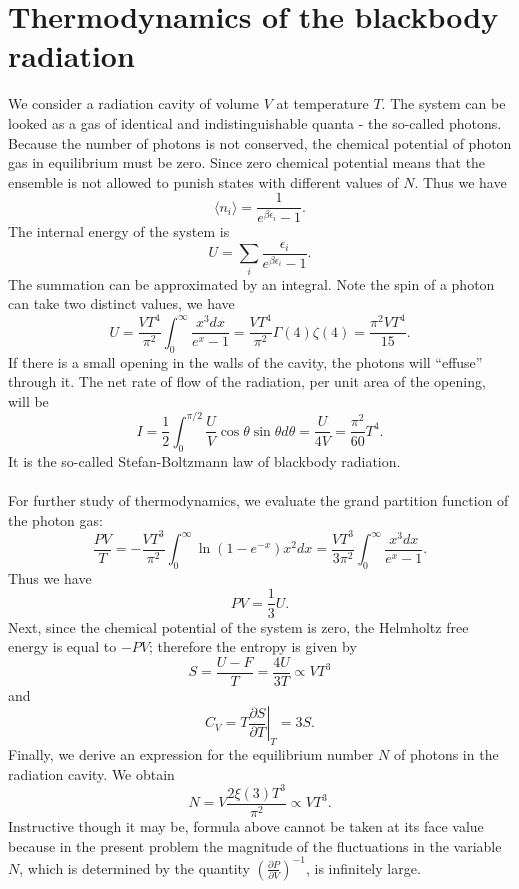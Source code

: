 \section{Thermodynamics of the blackbody radiation}
We consider a radiation cavity of volume $V$ at temperature $T$. The system can be looked as a gas of identical and indistinguishable quanta - the so-called photons. 
Because the number of photons is not conserved, the chemical potential of photon gas in equilibrium must be zero. Since zero chemical potential means that the ensemble is not allowed to punish states with different values of $N$. 
Thus we have
\[\langle n_i \rangle = \frac{1}{e^{\beta \epsilon_i} - 1}.\]
The internal energy of the system is
\[ U = \sum_i \frac{\epsilon_i}{e^{\beta \epsilon_i} - 1}.\]
The summation can be approximated by an integral. Note the spin of a photon can take two distinct values, we have
\[U = \frac{VT^4}{\pi^2} \int_0^{\infty} \frac{x^3dx}{e^x - 1} = \frac{VT^4}{\pi^2} \Gamma(4)\zeta(4) = \frac{\pi^2VT^4}{15}.\]
If there is a small opening in the walls of the cavity, the photons will ``effuse'' through it. The net rate of flow of the radiation, per unit area of the opening, will be
\[I = \frac{1}{2} \int_{0}^{\pi/2} \frac{U}{V} \cos\theta \sin\theta d\theta = \frac{U}{4V} = \frac{\pi^2}{60}T^4.\]
It is the so-called Stefan-Boltzmann law of blackbody radiation.
\\ \\
For further study of thermodynamics, we evaluate the grand partition function of the photon gas:
\[\frac{PV}{T} = -\frac{VT^3}{\pi^2} \int_0^{\infty} \ln(1-e^{-x}) x^2 dx = \frac{VT^3}{3\pi^2} \int_0^{\infty} \frac{x^3dx}{e^x - 1}.\]
Thus we have 
\[PV = \frac{1}{3}U.\]
Next, since the chemical potential of the system is zero, the Helmholtz free energy is equal to $-PV$; therefore the entropy is given by
\[S = \frac{U-F}{T} = \frac{4U}{3T} \propto VT^3\]
and
\[C_V = T \left. \frac{\partial S}{\partial T} \right|_T = 3S.\]
Finally, we derive an expression for the equilibrium number $N$ of photons in the radiation cavity. We obtain
\[N = V\frac{2\xi(3)T^3}{\pi^2} \propto VT^3.\]
Instructive though it may be, formula above cannot be taken at its face value because in the present problem the magnitude of the fluctuations in the variable $N$, which is determined by the quantity $\left(\frac{\partial P}{\partial V} \right)^{-1}$, is infinitely large.